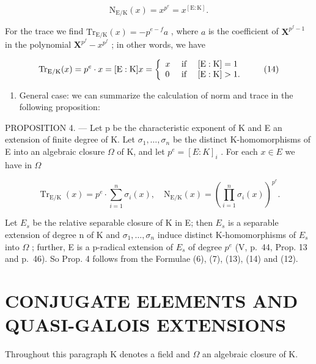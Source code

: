 \[
\mathrm{N} _ {\mathrm{E} / \mathrm{K}} (x) = x ^ {p ^ {e}} = x ^ {[ \mathrm{E}: \mathrm{K} ]}.\tag{13}
\]

For the trace we find \(\mathrm{Tr}_{\mathrm{E} / \mathrm{K}}(x) = -p^{e - f}a\) , where \(a\) is the coefficient of \(\mathbf{X}^{p^f - 1}\) in the polynomial \(\mathbf{X}^{p^f} - x^{p^f}\) ; in other words, we have

\[
\operatorname{Tr} _ {\mathrm{E} / \mathrm{K}} (x) = p ^ {e} \cdot x = [ \mathrm{E}: \mathrm{K} ] x = \left\{ \begin{array}{l l} x & \text { if } \quad [ \mathrm{E}: \mathrm{K} ] = 1 \\ 0 & \text { if } \quad [ \mathrm{E}: \mathrm{K} ] > 1. \end{array} \right.\tag{14}
\]

\begin{enumerate}
\def\labelenumi{\alph{enumi})}
\setcounter{enumi}{2}
\tightlist
\item
  General case: we can summarize the calculation of norm and trace in the following proposition:
\end{enumerate}

PROPOSITION 4. --- Let p be the characteristic exponent of K and E an extension of finite degree of K. Let \(\sigma_{1}, \ldots, \sigma_{n}\) be the distinct K-homomorphisms of E into an algebraic closure \(\Omega\) of K, and let \(p^{e} = [E : K]_{i}\) . For each \(x \in E\) we have in \(\Omega\)

\[
\operatorname{Tr} _ {\mathrm{E} / \mathrm{K}} (x) = p ^ {e} \cdot \sum_ {i = 1} ^ {n} \sigma_ {i} (x), \quad \mathrm{N} _ {\mathrm{E} / \mathrm{K}} (x) = \left(\prod_ {i = 1} ^ {n} \sigma_ {i} (x)\right) ^ {p ^ {e}}.\tag{15}
\]

Let \(E_s\) be the relative separable closure of K in E; then \(E_s\) is a separable extension of degree n of K and \(\sigma_1, \ldots, \sigma_n\) induce distinct K-homomorphisms of \(E_s\) into \(\Omega\) ; further, E is a p-radical extension of \(E_s\) of degree \(p^e\) (V, p.~44, Prop. 13 and p.~46). So Prop. 4 follows from the Formulae (6), (7), (13), (14) and (12).

\section{CONJUGATE ELEMENTS AND QUASI-GALOIS EXTENSIONS}

Throughout this paragraph K denotes a field and \(\Omega\) an algebraic closure of K.

